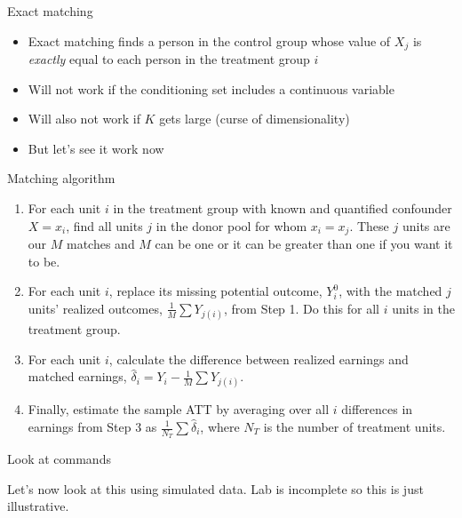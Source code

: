 \documentclass{beamer}
\begin{document}
\begin{frame}{Exact matching}

\begin{itemize}
\item Exact matching finds a person in the control group whose value of $X_j$ is \emph{exactly} equal to each person in the treatment group $i$
\item Will not work if the conditioning set includes a continuous variable
\item Will also not work if $K$ gets large (curse of dimensionality)
\item But let's see it work now
\end{itemize}

\end{frame}

\begin{frame}{Matching algorithm}

\begin{enumerate}
\item For each unit $i$ in the treatment group with known and quantified confounder $X=x_i$, find all units $j$ in the donor pool for whom $x_i=x_j$. These $j$ units are our $M$ matches and $M$ can be one or it can be greater than one if you want it to be.
\item For each unit $i$, replace its missing potential outcome, $Y^0_i$, with the matched $j$ units' realized outcomes, $\frac{1}{M} \sum {Y}_{j(i)}$, from Step 1. Do this for all $i$ units in the treatment group.
\item For each unit $i$, calculate the difference between realized earnings and matched earnings, $\widehat{\delta}_i=Y_i - \frac{1}{M} \sum {Y}_{j(i)}$.
\item Finally, estimate the sample ATT by averaging over all $i$ differences in earnings from Step 3 as $\frac{1}{N_T} \sum \widehat{\delta}_i$, where $N_T$ is the number of treatment units.
\end{enumerate}

\end{frame}

\begin{frame}{Look at commands}

Let's now look at this using simulated data. Lab is incomplete so this is just illustrative.  

\end{frame}
\end{document}
